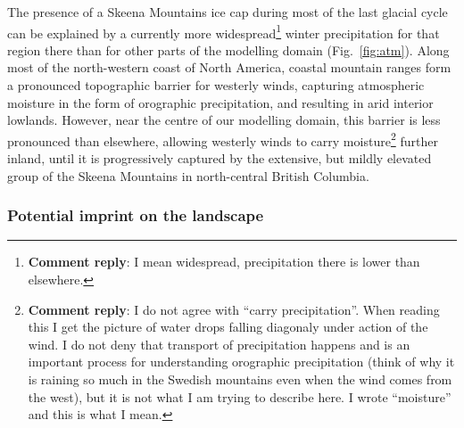 \documentclass[tc, manuscript]{copernicus}
\newcommand{\renote}[1]{\footnote{\textbf{Comment reply}: #1}}
\begin{document}
The presence of a Skeena Mountains ice cap during most of the last glacial
cycle can be explained by a currently more widespread\renote{
    I mean widespread, precipitation there is lower than elsewhere.}
winter precipitation for that region there than for other parts of the
modelling domain (Fig.~\ref{fig:atm}). Along most of the north-western coast of
North America, coastal mountain ranges form a pronounced topographic barrier
for westerly winds, capturing atmospheric moisture in the form of orographic
precipitation, and resulting in arid interior lowlands. However, near the
centre of our modelling domain, this barrier is less pronounced than elsewhere,
allowing westerly winds to carry moisture\renote{
    I do not agree with ``carry precipitation''. When reading this I get the
    picture of water drops falling diagonaly under action of the wind. I do not
    deny that transport of precipitation happens and
    is an important process for understanding orographic
    precipitation (think of why it is raining so much in the Swedish mountains
    even when the wind comes from the west), but it is not what I am trying to
    describe here. I wrote ``moisture'' and this is what I mean.}
further inland, until it is progressively captured by the extensive, but mildly
elevated group of the Skeena Mountains in north-central British Columbia.

\subsubsection{Potential imprint on the landscape}
\end{document}

